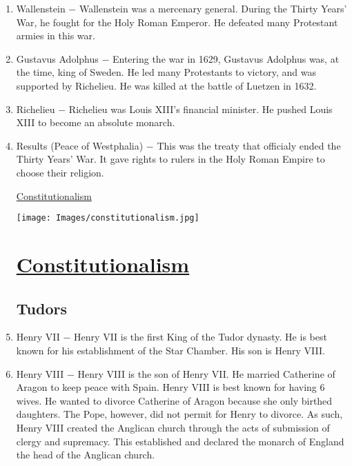 \documentclass[12pt]{article}
\begin{document}
\begin{enumerate}
\item Wallenstein $-$ Wallenstein was a mercenary general. During the Thirty Years' War, he fought for the Holy Roman Emperor. He defeated many Protestant armies in this war.

\item Gustavus Adolphus $-$ Entering the war in 1629, Gustavus Adolphus was, at the time, king of Sweden. He led many Protestants to victory, and was supported by Richelieu. He was killed at the battle of Luetzen in 1632.

\item Richelieu $-$ Richelieu was Louis XIII's financial minister. He pushed Louis XIII to become an absolute monarch.

\item Results (Peace of Westphalia) $-$  This was the treaty that officialy ended the Thirty Years' War. It gave rights to rulers in the Holy Roman Empire to choose their religion.

\newpage
\begin{center}
\end{center}
\begin{center}
\end{center}
\begin{center}
\underline{\Huge Constitutionalism}
\end{center}
\vspace{50pt}
\texttt{[image: Images/constitutionalism.jpg]}
\newpage

\section{\underline{Constitutionalism}}

\subsection{Tudors}

\item Henry VII $-$ Henry VII is the first King of the Tudor dynasty. He is best known for his establishment of the Star Chamber. His son is Henry VIII.

\item Henry VIII $-$ Henry VIII is the son of Henry VII. He married Catherine of Aragon to keep peace with Spain. Henry VIII is best known for having 6 wives. He wanted to divorce Catherine of Aragon because she only birthed daughters. The Pope, however, did not permit for Henry to divorce. As such, Henry VIII created the Anglican church through the acts of submission of clergy and supremacy. This established and declared the monarch of England the head of the Anglican church.


\end{enumerate}
\end{document}

